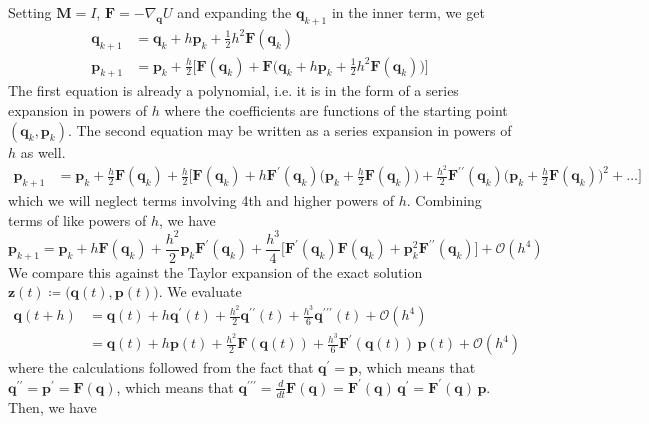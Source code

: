       Setting $\mathbf{M} = I$, $\mathbf{F} = - \nabla_\mathbf{q} U$ and expanding the $\mathbf{q}_{k+1}$ in the inner term, we get 
      \begin{align*}
        \mathbf{q}_{k+1} & = \mathbf{q}_k + h \mathbf{p}_k + \frac{1}{2} h^2 \mathbf{F} (\mathbf{q}_k) \\
        \mathbf{p}_{k+1} & = \mathbf{p}_k + \frac{h}{2} \bigg[ \mathbf{F} (\mathbf{q}_k) + \mathbf{F} \Big( \mathbf{q}_{k} + h \mathbf{p}_k + \frac{1}{2} h^2  \mathbf{F}(\mathbf{q}_k) \Big) \bigg]
      \end{align*}
      The first equation is already a polynomial, i.e. it is in the form of a series expansion in powers of $h$ where the coefficients are functions of the starting point $(\mathbf{q}_k, \mathbf{p}_k)$. The second equation may be written as a series expansion in powers of $h$ as well. 
      \begin{align*}
        \mathbf{p}_{k+1} & = \mathbf{p}_k + \frac{h}{2} \mathbf{F}(\mathbf{q}_k) + \frac{h}{2} \bigg[ \mathbf{F} (\mathbf{q}_k) + h \mathbf{F}^\prime (\mathbf{q}_k) \big( \mathbf{p}_k + \frac{h}{2} \mathbf{F}(\mathbf{q}_k) \big) + \frac{h^2}{2} \mathbf{F}^{\prime\prime} (\mathbf{q}_k) \big( \mathbf{p}_k + \frac{h}{2} \mathbf{F}(\mathbf{q}_k)\big)^2 + \ldots \bigg]
      \end{align*}
      which we will neglect terms involving 4th and higher powers of $h$. Combining terms of like powers of $h$, we have 
      \begin{equation}
        \mathbf{p}_{k+1} = \mathbf{p}_k + h \mathbf{F}(\mathbf{q}_k) + \frac{h^2}{2} \mathbf{p}_k \mathbf{F}^\prime (\mathbf{q}_k) + \frac{h^3}{4} \big[ \mathbf{F}^\prime (\mathbf{q}_k) \mathbf{F}(\mathbf{q}_k) + \mathbf{p}_k^2 \mathbf{F}^{\prime\prime} (\mathbf{q}_k)\big] + \mathcal{O}(h^4)
      \end{equation}
      We compare this against the Taylor expansion of the exact solution $\mathbf{z}(t) \coloneqq \big( \mathbf{q}(t), \mathbf{p}(t) \big)$. We evaluate 
      \begin{align*}
        \mathbf{q}(t + h) & = \mathbf{q}(t) + h \mathbf{q}^\prime (t) + \frac{h^2}{2} \mathbf{q}^{\prime\prime} (t) + \frac{h^3}{6} \mathbf{q}^{\prime\prime\prime} (t) + \mathcal{O}(h^4) \\
        & = \mathbf{q}(t) + h \mathbf{p} (t) + \frac{h^2}{2} \mathbf{F}(\mathbf{q}(t)) + \frac{h^3}{6} \mathbf{F}^\prime (\mathbf{q}(t)) \, \mathbf{p}(t) + \mathcal{O}(h^4) 
      \end{align*}
      where the calculations followed from the fact that $\mathbf{q}^\prime = \mathbf{p}$, which means that $\mathbf{q}^{\prime\prime} = \mathbf{p}^\prime = \mathbf{F}(\mathbf{q})$, which means that $\mathbf{q}^{\prime\prime\prime} = \frac{d}{dt} \mathbf{F}(\mathbf{q}) = \mathbf{F}^\prime (\mathbf{q}) \, \mathbf{q}^\prime = \mathbf{F}^\prime (\mathbf{q}) \, \mathbf{p}$. Then, we have 
